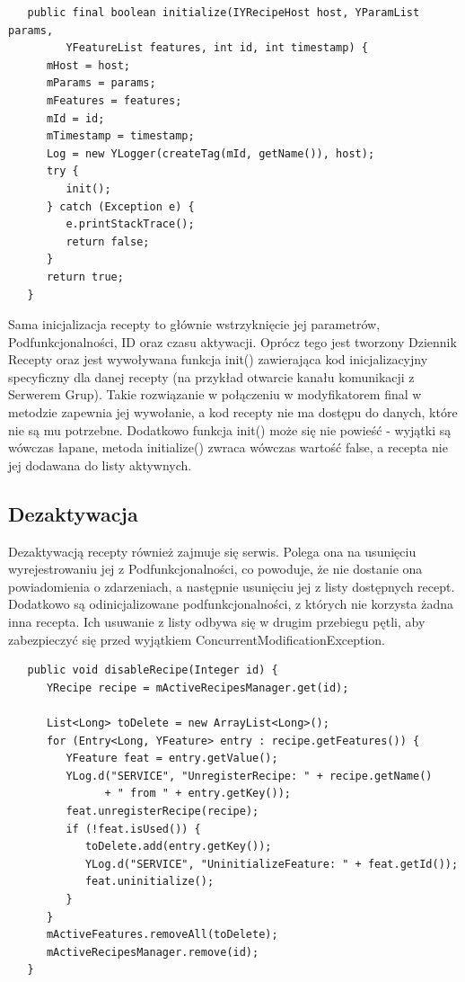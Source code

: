 \documentclass[11pt,a4paper,polish,thesis]{dcsbook}
\begin{document}
\begin{verbatim}
   public final boolean initialize(IYRecipeHost host, YParamList params,
         YFeatureList features, int id, int timestamp) {
      mHost = host;
      mParams = params;
      mFeatures = features;
      mId = id;
      mTimestamp = timestamp;
      Log = new YLogger(createTag(mId, getName()), host);
      try {
         init();
      } catch (Exception e) {
         e.printStackTrace();
         return false;
      }
      return true;
   }
\end{verbatim}

Sama inicjalizacja recepty to głównie wstrzyknięcie jej parametrów, Podfunkcjonalności, ID oraz czasu aktywacji. Oprócz tego jest tworzony Dziennik Recepty oraz jest wywoływana funkcja init() zawierająca kod inicjalizacyjny specyficzny dla danej recepty (na przykład otwarcie kanału komunikacji z Serwerem Grup). Takie rozwiązanie w połączeniu w modyfikatorem final w metodzie zapewnia jej wywołanie, a kod recepty nie ma dostępu do danych, które nie są mu potrzebne. Dodatkowo funkcja init() może się nie powieść - wyjątki są wówczas łapane, metoda initialize() zwraca wówczas wartość false, a recepta nie jej dodawana do listy aktywnych.
\subsection{Dezaktywacja}
Dezaktywacją recepty również zajmuje się serwis. Polega ona na usunięciu wyrejestrowaniu jej z Podfunkcjonalności, co powoduje, że nie dostanie ona powiadomienia o zdarzeniach, a następnie usunięciu jej z listy dostępnych recept. Dodatkowo są odinicjalizowane podfunkcjonalności, z których nie korzysta żadna inna recepta. Ich usuwanie z listy odbywa się w drugim przebiegu pętli, aby zabezpieczyć się przed wyjątkiem ConcurrentModificationException.
\begin{verbatim}
   public void disableRecipe(Integer id) {
      YRecipe recipe = mActiveRecipesManager.get(id);
      
      List<Long> toDelete = new ArrayList<Long>();
      for (Entry<Long, YFeature> entry : recipe.getFeatures()) {
         YFeature feat = entry.getValue();
         YLog.d("SERVICE", "UnregisterRecipe: " + recipe.getName()
               + " from " + entry.getKey());
         feat.unregisterRecipe(recipe);
         if (!feat.isUsed()) {
            toDelete.add(entry.getKey());
            YLog.d("SERVICE", "UninitializeFeature: " + feat.getId());
            feat.uninitialize();
         }
      }
      mActiveFeatures.removeAll(toDelete);
      mActiveRecipesManager.remove(id);
   }
\end{verbatim}
\end{document}
